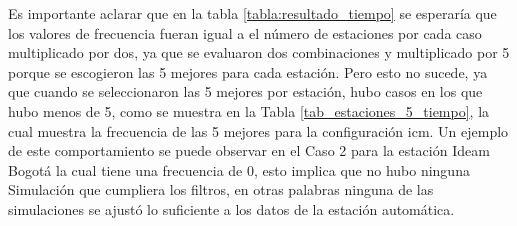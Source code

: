 Es importante aclarar que en la tabla \ref{tabla:resultado_tiempo} se esperaría que los valores de frecuencia fueran igual a el número de estaciones por cada caso multiplicado por dos, ya que se evaluaron dos combinaciones y multiplicado por 5 porque se escogieron las 5 mejores para cada estación. Pero esto no sucede, ya que cuando se seleccionaron las 5 mejores por estación, hubo casos en los que hubo menos de 5, como se muestra en la Tabla \ref{tab_estaciones_5_tiempo}, la cual muestra la frecuencia de las 5 mejores para la configuración icm. Un ejemplo de este comportamiento se puede observar en el Caso 2 para la estación Ideam Bogotá  la cual tiene una frecuencia de 0, esto implica que no hubo ninguna Simulación que cumpliera los filtros, en otras palabras ninguna de las simulaciones se ajustó lo suficiente a los datos de la estación automática.\\

